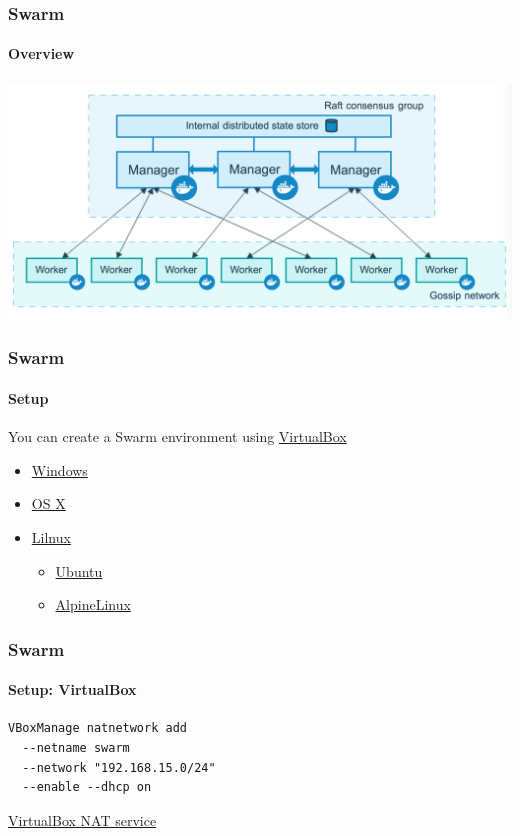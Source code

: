 \begin{frame}
\frametitle{Swarm}
\framesubtitle{Overview}
\begin{center}
\includegraphics[width=\columnwidth]{./Figure/swarm-diagram}
\end{center}
\end{frame}

\begin{frame}
\frametitle{Swarm}
\framesubtitle{Setup}
You can create a Swarm environment using \href{https://www.virtualbox.org/wiki/Downloads}{VirtualBox}
\vspace{0.4cm}
\begin{itemize}
\item \href{https://download.virtualbox.org/virtualbox/6.0.8/VirtualBox-6.0.8-130520-Win.exe}{Windows}
\item \href{https://download.virtualbox.org/virtualbox/6.0.8/VirtualBox-6.0.8-130520-OSX.dmg}{OS X}
\item \href{https://www.virtualbox.org/wiki/Linux_Downloads}{Lilnux}
  \begin{itemize}
    \item \href{https://download.virtualbox.org/virtualbox/6.0.8/virtualbox-6.0_6.0.8-130520~Ubuntu~bionic_amd64.deb}{Ubuntu}
    \item \href{http://dl-cdn.alpinelinux.org/alpine/v3.9/releases/x86_64/alpine-virt-3.9.4-x86_64.iso}{AlpineLinux}
  \end{itemize}
\end{itemize}
\end{frame}


\begin{frame}[fragile]
\frametitle{Swarm}
\framesubtitle{Setup: VirtualBox}
\begin{lstlisting}
VBoxManage natnetwork add 
  --netname swarm 
  --network "192.168.15.0/24" 
  --enable --dhcp on
\end{lstlisting}
\tiny
\href{https://www.virtualbox.org/manual/ch06.html#network_nat_service}{VirtualBox NAT service}
\normalsize
\end{frame}


